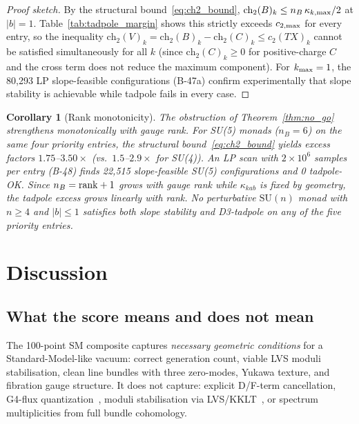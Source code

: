 \documentclass[11pt,a4paper]{article}
\newtheorem{corollary}{Corollary}
\newcommand{\ch}{\mathrm{ch}}
\begin{document}
\begin{proof}[Proof sketch]
  By the structural bound~\eqref{eq:ch2_bound},
  $\ch_2(B)_k \leq n_B\,\kappa_{k,\rm max}/2$ at $|b|=1$.
  Table~\ref{tab:tadpole_margin} shows this strictly exceeds
  $c_{2,\rm max}$ for every entry, so the inequality
  $\ch_2(V)_k = \ch_2(B)_k - \ch_2(C)_k \leq c_2(TX)_k$
  cannot be satisfied simultaneously for all $k$
  (since $\ch_2(C)_k \geq 0$ for positive-charge $C$
  and the cross term does not reduce the maximum component).
  For $k_{\rm max}=1$, the 80{,}293 LP slope-feasible
  configurations (B-47a) confirm experimentally
  that slope stability is achievable while tadpole fails in every case.
\end{proof}

\begin{corollary}[Rank monotonicity]
\label{cor:rank}
  The obstruction of Theorem~\ref{thm:no_go} strengthens monotonically
  with gauge rank.  For SU(5) monads ($n_B=6$) on the same four priority
  entries, the structural bound~\eqref{eq:ch2_bound} yields excess factors
  $1.75$--$3.50\times$ (vs.\ $1.5$--$2.9\times$ for SU(4)).
  An LP scan with $2\times10^6$ samples per entry (B-48) finds
  22{,}515 slope-feasible SU(5) configurations and 0 tadpole-OK.
  Since $n_B = {\rm rank}+1$ grows with gauge rank while $\kappa_{kab}$
  is fixed by geometry, the tadpole excess grows linearly with rank.
  No perturbative $\mathrm{SU}(n)$ monad with $n\geq 4$ and $|b|\leq 1$
  satisfies both slope stability and D3-tadpole on any of the five
  priority entries.
\end{corollary}

\section{Discussion}
\label{sec:discussion}

\subsection{What the score means and does not mean}

The 100-point SM composite captures \emph{necessary geometric
conditions} for a Standard-Model-like vacuum: correct generation
count, viable LVS moduli stabilisation, clean line bundles with
three zero-modes, Yukawa texture, and fibration gauge structure.
It does not capture: explicit D/F-term cancellation, G4-flux
quantization~\cite{Dasgupta1999}, moduli stabilisation via
LVS/KKLT~\cite{Balasubramanian2005,KKLT2003}, or spectrum
multiplicities from full bundle cohomology.
\end{document}
